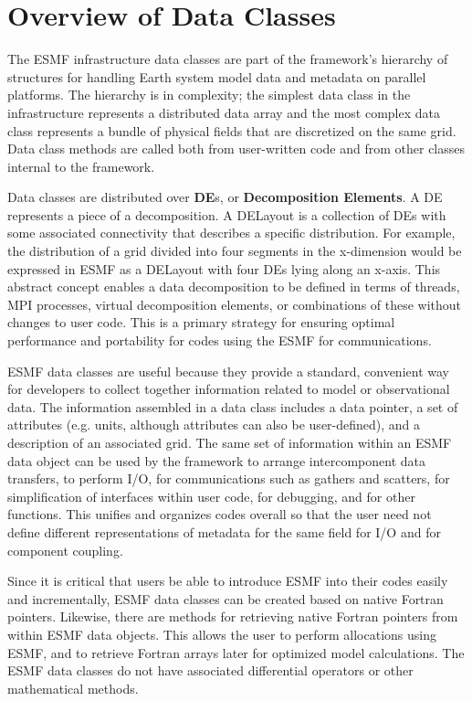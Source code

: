 
\section{Overview of Data Classes}

The ESMF infrastructure data classes are part of the framework's 
hierarchy of structures for handling Earth system model data and 
metadata on parallel platforms.  The hierarchy is in complexity; the 
simplest data class in the infrastructure represents a distributed data
array and the most complex data class represents a bundle of physical 
fields that are discretized on the same grid.  Data class methods 
are called both from user-written code and from other classes 
internal to the framework. 

Data classes are distributed over {\bf DE}s, or {\bf Decomposition Elements}.  
A DE represents a piece of a decomposition.  A DELayout is a collection
of DEs with some associated connectivity that describes a specific 
distribution.  For example, the distribution of a grid divided 
into four segments in the x-dimension would be expressed in ESMF as
a DELayout with four DEs lying along an x-axis. This abstract concept 
enables a data decomposition to be defined in 
terms of threads, MPI processes, virtual decomposition elements, or
combinations of these without changes to user code.  This is a
primary strategy for ensuring optimal performance and portability
for codes using the ESMF for communications.

ESMF data classes are useful because they provide a standard, 
convenient way for developers to collect together information 
related to model or observational data.  The information assembled 
in a data class includes a data pointer, a set of attributes 
(e.g. units, although attributes can also be user-defined), and a 
description of an associated grid.  The same set of information within 
an ESMF data object can be used by the framework to arrange 
intercomponent data transfers, to perform I/O, for communications
such as gathers and scatters, for simplification of interfaces 
within user code, for debugging, and for other functions.  
This unifies and organizes codes overall so that the user need not
define different representations of metadata for the same field 
for I/O and for component coupling.  

Since it is critical that users be able to introduce ESMF into their
codes easily and incrementally, ESMF data classes can be created based 
on native Fortran pointers.  Likewise, there are methods for retrieving 
native Fortran pointers from within ESMF data objects.  This allows
the user to perform allocations using ESMF, and to retrieve Fortran
arrays later for optimized model calculations.  The ESMF data classes 
do not have associated differential operators or other mathematical 
methods.

